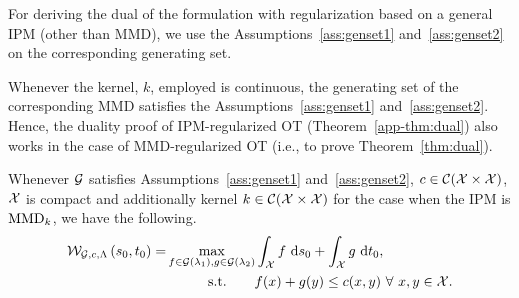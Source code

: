 For deriving the dual of the formulation with regularization based on a general IPM (other than MMD), we use the Assumptions~\ref{ass:genset1} and~\ref{ass:genset2} on the corresponding generating set.
\begin{remark}
Whenever the kernel, $k$, employed is continuous, the generating set of the corresponding MMD satisfies the Assumptions~\ref{ass:genset1} and~\ref{ass:genset2}. Hence, the duality proof of IPM-regularized OT (Theorem~\ref{app-thm:dual}) also works in the case of MMD-regularized OT  (i.e., to prove Theorem~\ref{thm:dual}).
\end{remark}
\begin{theoremBox}
\begin{theorem}\label{app-thm:dual}
Whenever $\mathcal{G}$ satisfies Assumptions~\ref{ass:genset1} and~\ref{ass:genset2}, $c\in\mathcal{C}(\mathcal{X}\times\mathcal{X})$, $\mathcal{X}$ is compact and additionally kernel $k\in \mathcal{C}(\mathcal{X}\times\mathcal{X})$ for the case when the IPM is $\textup{MMD}_k$, we have the following.
\begin{align}\label{app:eqn-dual}
\calWI\left(s_0,t_0\right)=&\max\limits_{f\in\calG(\lambda_1),g\in\calG(\lambda_2)}\int_\calX f\ \textup{d}s_0+\int_\calX g\ \textup{d}t_0, \nonumber\\
&\ \ \ \ \ \ \ \ \ \textup{s.t.}\ \ \ \ \ \  f(x)+g(y)\le c(x,y)\ \forall\ x,y\in\calX.
\end{align}
\end{theorem}
\end{theoremBox}
